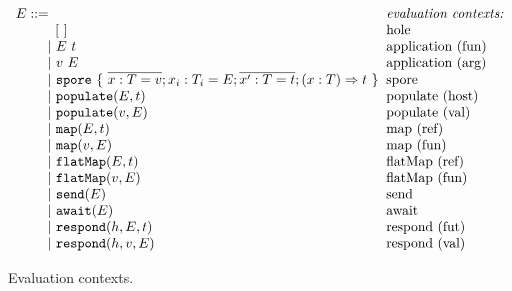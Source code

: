 \begin{figure}
\centering
 $\ba[t]{l@{\hspace{2mm}}l}
E ::=                                                                                                     & \mbox{\it{evaluation contexts:}} \\
\gap \:\:\:\: [~]                                                                                         & \mbox{hole} \\
\gap ~|~  E~t                                                                                             & \mbox{application (fun)} \\
\gap ~|~  v~E                                                                                             & \mbox{application (arg)} \\
\gap ~|~  \texttt{spore}~\{~\seq{x : T = v} ; x_i : T_i = E ; \seq{x' : T = t} ; (x: T) \Rightarrow t~\}  & \mbox{spore} \\
\gap ~|~  \texttt{populate}(E, t)                                                                         & \mbox{populate (host)} \\
\gap ~|~  \texttt{populate}(v, E)                                                                         & \mbox{populate (val)} \\
\gap ~|~  \texttt{map}(E, t)                                                                              & \mbox{map (ref)} \\
\gap ~|~  \texttt{map}(v, E)                                                                              & \mbox{map (fun)} \\
\gap ~|~  \texttt{flatMap}(E, t)                                                                          & \mbox{flatMap (ref)} \\
\gap ~|~  \texttt{flatMap}(v, E)                                                                          & \mbox{flatMap (fun)} \\
\gap ~|~  \texttt{send}(E)                                                                                & \mbox{send} \\
\gap ~|~  \texttt{await}(E)                                                                               & \mbox{await} \\
\gap ~|~  \texttt{respond}(h, E, t)                                                                       & \mbox{respond (fut)} \\
\gap ~|~  \texttt{respond}(h, v, E)                                                                       & \mbox{respond (val)} \\
\ea$
\caption{Evaluation contexts.}\label{fig:eval-ctx}
\end{figure}

